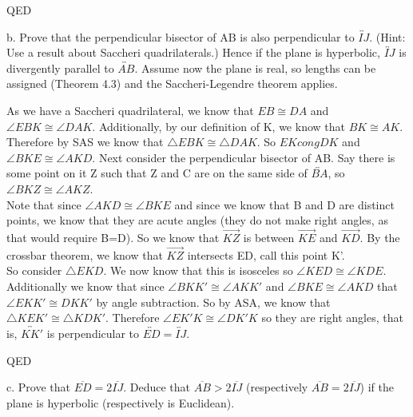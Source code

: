 \documentclass[12pt,letterpaper]{article}
\newcommand{\Proof}{\noindent {\bf Proof: }}
\newcommand{\QED}{\begin{flushright}QED\end{flushright}}
\begin{document}
\QED


\newpage 

b. Prove that the perpendicular bisector of AB is also perpendicular to $\overleftrightarrow{IJ}$. (Hint: Use a result about Saccheri quadrilaterals.)  Hence if the plane is hyperbolic, $\overleftrightarrow{IJ}$ is divergently parallel to $\overleftrightarrow{AB}$.  Assume now the plane is real, so lengths can be assigned (Theorem 4.3) and the Saccheri-Legendre theorem applies. \\

\Proof

As we have a Saccheri quadrilateral, we know that $EB \cong DA$ and $\angle EBK \cong \angle DAK$.  Additionally, by our definition of K, we know that $BK \cong AK$.  Therefore by SAS we know that $\triangle EBK \cong \triangle DAK$.  So $EK cong DK$ and $\angle BKE \cong \angle AKD$.  Next consider the perpendicular bisector of AB.  Say there is some point on it Z such that Z and C are on the same side of $\overleftrightarrow{BA}$, so $\angle BKZ \cong \angle AKZ$. \\

Note that since $\angle AKD \cong \angle BKE$ and since we know that B and D are distinct points, we know that they are acute angles (they do not make right angles, as that would require B=D). So we know that $\overrightarrow{KZ}$ is between $\overrightarrow{KE}$ and $\overrightarrow{KD}$.  By the crossbar theorem, we know that $\overrightarrow{KZ}$ intersects ED, call this point K'.\\

So consider $\triangle EKD$.  We now know that this is isosceles so $\angle KED \cong \angle KDE$. Additionally we know that since $\angle BKK' \cong \angle AKK'$ and $\angle BKE \cong \angle AKD$ that $\angle EKK' \cong  DKK'$ by angle subtraction.  So by ASA, we know that $\triangle KEK' \cong\triangle KDK'$.  Therefore $\angle EK'K \cong \angle DK'K$ so they are right angles, that is, $\overleftrightarrow{KK'}$ is perpendicular to $\overleftrightarrow{ED} = \overleftrightarrow{IJ}$. 



\QED







\newpage 

c. Prove that $\overline{ED} = 2\overline{IJ}$.  Deduce that $\overline{AB} > 2\overline{IJ}$ (respectively $\overline{AB} = 2\overline{IJ}$) if the plane is hyperbolic (respectively is Euclidean).\\
\end{document}
